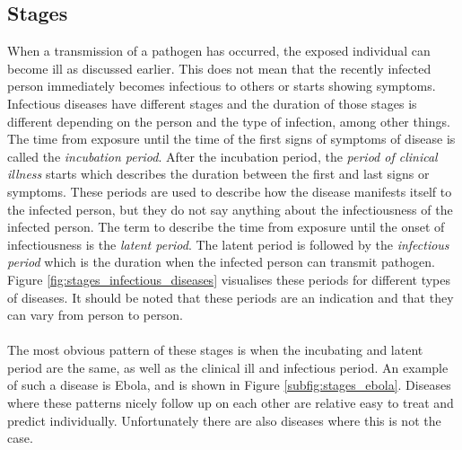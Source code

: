 \subsection{Stages}
\label{subsec:stages}
When a transmission of a pathogen has occurred, the exposed individual can become ill as discussed earlier. This does not mean that the recently infected person immediately becomes infectious to others or starts showing symptoms. Infectious diseases have different stages and the duration of those stages is different depending on the person and the type of infection, among other things. The time from exposure until the time of the first signs of symptoms of disease is called the \textit{incubation period}. After the incubation period, the \textit{period of clinical illness} starts which describes the duration between the first and last signs or symptoms. These periods are used to describe how the disease manifests itself to the infected person, but they do not say anything about the infectiousness of the infected person. The term to describe the time from exposure until the onset of infectiousness is the \textit{latent period}. The latent period is followed by the \textit{infectious period} which is the duration when the infected person can transmit pathogen. Figure \ref{fig:stages_infectious_diseases} visualises these periods for different types of diseases. It should be noted that these periods are an indication and that they can vary from person to person.  \cite{book:principles_infectious_diseases}
\\\\
The most obvious pattern of these stages is when the incubating and latent period are the same, as well as the clinical ill and infectious period. An example of such a disease is Ebola, and is shown in Figure \ref{subfig:stages_ebola}. Diseases where these patterns nicely follow up on each other are relative easy to treat and predict individually. Unfortunately there are also diseases where this is not the case.

